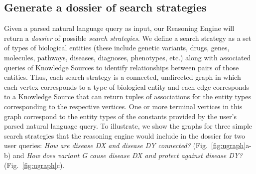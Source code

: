 \documentclass[11pt,notitlepage]{article}
\begin{document}
\subsection{Generate a dossier of search strategies}
\label{section:strategies}
Given a parsed natural language query as input, our Reasoning Engine will return
a {\em dossier\/} of possible {\em search strategies.\/} We define a search
strategy as a set of types of biological entities (these include
genetic variants, drugs, genes, molecules, pathways, diseases, diagnoses, phenotypes, etc.) along with associated queries of Knowledge Sources to identify relationships
between pairs of those entities. Thus, each search strategy is a connected,
undirected graph in which each vertex corresponds to a type of biological entity
and each edge corresponds to a Knowledge Source that can return tuples of
associations for the entity types corresponding to the respective vertices.  One
or more terminal vertices in this graph correspond to the entity types of the constants provided by 
the user's parsed natural language query. To illustrate, we show 
the graphs for three simple search strategies that the reasoning engine
would include in the dossier for two user queries: {\em How are disease DX and
disease DY connected?\/} (Fig.~\ref{fig:ugraph}a-b) and {\em How does variant G
cause disease DX and protect against disease DY?\/} (Fig.~\ref{fig:ugraph}c).
\end{document}
